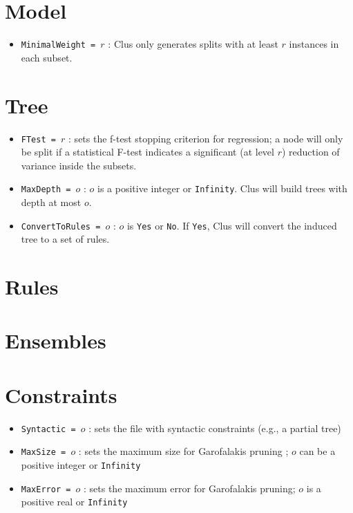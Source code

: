 \section{Model}

\begin{itemize}
\item {\tt MinimalWeight = $r$} : Clus only generates splits with at least $r$ instances in each subset.
\end{itemize}

\section{Tree}

\begin{itemize}
\item {\tt FTest = $r$} : sets the f-test stopping criterion for regression; a node will only be split if a statistical F-test indicates a significant (at level $r$) reduction of variance inside the subsets.
\item {\tt MaxDepth = $o$} : $o$ is a positive integer or {\tt Infinity}.  Clus will build trees with depth at  most $o$.
\item {\tt ConvertToRules = $o$} : $o$ is {\tt Yes} or {\tt No}.  If {\tt Yes},  Clus will convert the induced tree to a set of rules.
\end{itemize}

\section{Rules}


\section{Ensembles}

\section{Constraints}

\begin{itemize}
\item {\tt Syntactic = $o$} : sets the file with syntactic constraints (e.g., a partial tree) \cite{paper-on-constraints}
\item {\tt MaxSize = $o$} : sets the maximum size for Garofalakis pruning \cite{Garofalakis}; $o$ can be a positive integer or {\tt Infinity}
\item {\tt MaxError = $o$} : sets the maximum error for Garofalakis pruning; $o$ is a positive real or {\tt Infinity}
\end{itemize}


